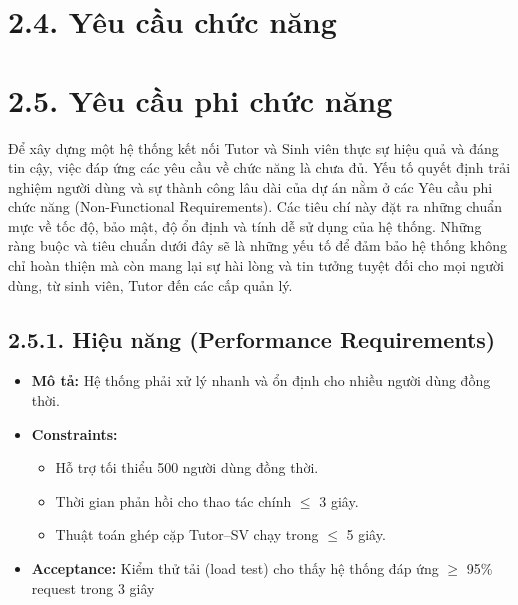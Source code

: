 \section*{2.4. Yêu cầu chức năng}



\section*{2.5. Yêu cầu phi chức năng}
Để xây dựng một hệ thống kết nối Tutor và Sinh viên thực sự hiệu quả và đáng tin cậy, việc đáp ứng các yêu cầu về chức năng là chưa đủ. Yếu tố quyết định trải nghiệm người dùng và sự thành công lâu dài của dự án nằm ở các Yêu cầu phi chức năng (Non-Functional Requirements). Các tiêu chí này đặt ra những chuẩn mực về tốc độ, bảo mật, độ ổn định và tính dễ sử dụng của hệ thống. Những ràng buộc và tiêu chuẩn dưới đây sẽ là những yếu tố để đảm bảo hệ thống không chỉ hoàn thiện mà còn mang lại sự hài lòng và tin tưởng tuyệt đối cho mọi người dùng, từ sinh viên, Tutor đến các cấp quản lý.

\subsection*{2.5.1. Hiệu năng (Performance Requirements)}
\begin{itemize}
    \item \textbf{Mô tả:} Hệ thống phải xử lý nhanh và ổn định cho nhiều người dùng đồng thời.
    \item \textbf{Constraints:}
    \begin{itemize}
        \item Hỗ trợ tối thiểu 500 người dùng đồng thời.
        \item Thời gian phản hồi cho thao tác chính $\leq$ 3 giây.
        \item Thuật toán ghép cặp Tutor–SV chạy trong $\leq$ 5 giây.
    \end{itemize}
    \item \textbf{Acceptance:} Kiểm thử tải (load test) cho thấy hệ thống đáp ứng $\geq$ 95\% request trong 3 giây
\end{itemize}


